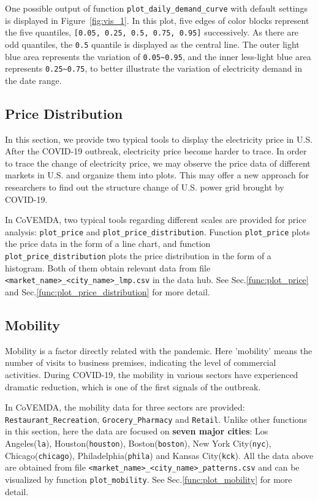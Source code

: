 \documentclass[10pt]{article}
\newcommand{\covemda}{CoVEMDA}
\numberwithin{equation}{section}
\numberwithin{table}{section}
\numberwithin{figure}{section}
\begin{document}
One possible output of function \verb!plot_daily_demand_curve! with default settings is displayed in Figure~\ref{fig:vis_1}. In this plot, five edges of color blocks represent the five quantiles, \verb![0.05, 0.25, 0.5, 0.75, 0.95]! successively. As there are odd quantiles, the \verb!0.5! quantile is displayed as the central line. The outer light blue area represents the variation of \verb!0.05~0.95!, and the inner less-light blue area represents \verb!0.25~0.75!, to better illustrate the variation of electricity demand in the date range.



\subsection{Price Distribution}

In this section, we provide two typical tools to display the electricity price in U.S. After the COVID-19 outbreak, electricity price become harder to trace. In order to trace the change of electricity price, we may observe the price data of different markets in U.S. and organize them into plots. This may offer a new approach for researchers to find out the structure change of U.S. power grid brought by COVID-19.

In \covemda{}, two typical tools regarding different scales are provided for price analysis: \verb!plot_price! and \verb!plot_price_distribution!. Function \verb!plot_price! plots the price data in the form of a line chart, and function \verb!plot_price_distribution! plots the price distribution in the form of a histogram. Both of them obtain relevant data from file \\\verb!<market_name>_<city_name>_lmp.csv! in the data hub. See Sec.\ref{func:plot_price} and Sec.\ref{func:plot_price_distribution} for more detail.



\subsection{Mobility}

Mobility is a factor directly related with the pandemic. Here 'mobility' means the number of visits to business premises, indicating the level of commercial activities. During COVID-19, the mobility in various sectors have experienced dramatic reduction, which is one of the first signals of the outbreak.

In \covemda{}, the mobility data for three sectors are provided: \verb!Restaurant_Recreation!, \verb!Grocery_Pharmacy! and \verb!Retail!. Unlike other functions in this section, here the data are focused on \textbf{seven major cities}: Los Angeles(\verb!la!), Houston(\verb!houston!), Boston(\verb!boston!), New York City(\verb!nyc!), Chicago(\verb!chicago!), Philadelphia(\verb!phila!) and Kansas City(\verb!kck!). All the data above are obtained from file \verb!<market_name>_<city_name>_patterns.csv! and can be visualized by function \verb!plot_mobility!. See Sec.\ref{func:plot_mobility} for more detail.
\end{document}

